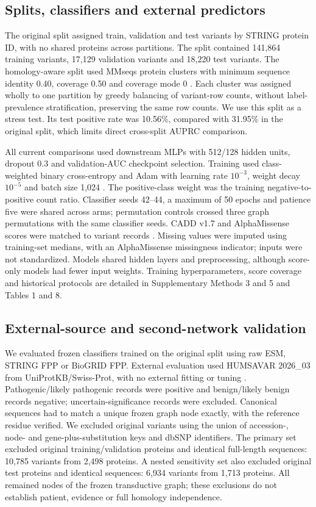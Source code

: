 \documentclass[conference]{IEEEtran}
\begin{document}
\subsection{Splits, classifiers and external predictors}

The original split assigned train, validation and test variants by STRING protein ID, with no shared proteins across partitions. The split contained 141,864 training variants, 17,129 validation variants and 18,220 test variants. The homology-aware split used MMseqs protein clusters with minimum sequence identity 0.40, coverage 0.50 and coverage mode 0 \cite{Steinegger2017MMseqs2}. Each cluster was assigned wholly to one partition by greedy balancing of variant-row counts, without label-prevalence stratification, preserving the same row counts. We use this split as a stress test. Its test positive rate was 10.56\%, compared with 31.95\% in the original split, which limits direct cross-split AUPRC comparison.

All current comparisons used downstream MLPs with 512/128 hidden units, dropout 0.3 and validation-AUC checkpoint selection. Training used class-weighted binary cross-entropy and Adam with learning rate $10^{-3}$, weight decay $10^{-5}$ and batch size 1,024 \cite{Kingma2015Adam}. The positive-class weight was the training negative-to-positive count ratio. Classifier seeds 42--44, a maximum of 50 epochs and patience five were shared across arms; permutation controls crossed three graph permutations with the same classifier seeds. CADD v1.7 and AlphaMissense scores were matched to variant records \cite{Schubach2024CADDv17,Cheng2023AlphaMissense}. Missing values were imputed using training-set medians, with an AlphaMissense missingness indicator; inputs were not standardized. Models shared hidden layers and preprocessing, although score-only models had fewer input weights. Training hyperparameters, score coverage and historical protocols are detailed in Supplementary Methods 3 and 5 and Tables 1 and 8.

\subsection{External-source and second-network validation}

We evaluated frozen classifiers trained on the original split using raw ESM, STRING FPP or BioGRID FPP. External evaluation used HUMSAVAR 2026\_03 from UniProtKB/\allowbreak{}Swiss-Prot, with no external fitting or tuning \cite{UniProt2025}. Pathogenic/likely pathogenic records were positive and benign/likely benign records negative; uncertain-significance records were excluded. Canonical sequences had to match a unique frozen graph node exactly, with the reference residue verified. We excluded original variants using the union of accession-, node- and gene-plus-substitution keys and dbSNP identifiers. The primary set excluded original training/validation proteins and identical full-length sequences: 10,785 variants from 2,498 proteins. A nested sensitivity set also excluded original test proteins and identical sequences: 6,934 variants from 1,713 proteins. All remained nodes of the frozen transductive graph; these exclusions do not establish patient, evidence or full homology independence.
\end{document}

